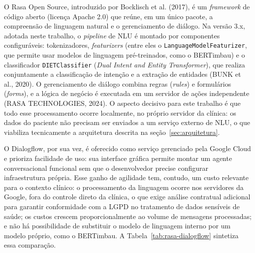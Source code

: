 \documentclass[12pt,a4paper]{extarticle}
\begin{document}
O Rasa Open Source, introduzido por Bocklisch et al. (2017), é um \textit{framework} de código aberto (licença Apache 2.0) que reúne, em um único pacote, a compreensão de linguagem natural e o gerenciamento de diálogo. Na versão 3.x, adotada neste trabalho, o \textit{pipeline} de NLU é montado por componentes configuráveis: tokenizadores, \textit{featurizers} (entre eles o \texttt{LanguageModel\allowbreak{}Featurizer}, que permite usar modelos de linguagem pré-treinados, como o BERTimbau) e o classificador \texttt{DIETClassifier} (\textit{Dual Intent and Entity Transformer}), que realiza conjuntamente a classificação de intenção e a extração de entidades (BUNK et al., 2020). O gerenciamento de diálogo combina regras (\textit{rules}) e formulários (\textit{forms}), e a lógica de negócio é executada em um servidor de ações independente (RASA TECHNOLOGIES, 2024). O aspecto decisivo para este trabalho é que todo esse processamento ocorre localmente, no próprio servidor da clínica: os dados do paciente não precisam ser enviados a um serviço externo de NLU, o que viabiliza tecnicamente a arquitetura descrita na seção~\ref{sec:arquitetura}.

O Dialogflow, por sua vez, é oferecido como serviço gerenciado pela Google Cloud e prioriza facilidade de uso: sua interface gráfica permite montar um agente conversacional funcional sem que o desenvolvedor precise configurar infraestrutura própria. Esse ganho de agilidade tem, contudo, um custo relevante para o contexto clínico: o processamento da linguagem ocorre nos servidores da Google, fora do controle direto da clínica, o que exige análise contratual adicional para garantir conformidade com a LGPD no tratamento de dados sensíveis de saúde; os custos crescem proporcionalmente ao volume de mensagens processadas; e não há possibilidade de substituir o modelo de linguagem interno por um modelo próprio, como o BERTimbau. A Tabela~\ref{tab:rasa-dialogflow} sintetiza essa comparação.
\end{document}
